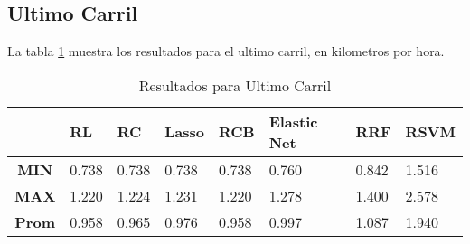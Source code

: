 \subsection{Ultimo Carril}

La tabla \ref{tab:resultadosScikitUltimoCarril} muestra los resultados para el ultimo carril, en kilometros por hora.


\begin{table}[H]
    \centering
    \caption{Resultados para Ultimo Carril}
    \label{tab:resultadosScikitUltimoCarril}
    \begin{tabular}{|c|l|l|l|l|l|l|l|} \hline
        & \textbf{RL} & \textbf{RC} & \textbf{Lasso} & \textbf{RCB} & \textbf{Elastic Net} & \textbf{RRF} & \textbf{RSVM} \\ \hline

        \textbf{MIN} & 0.738 & 0.738 & 0.738 & 0.738 & 0.760 & 0.842 & 1.516 \\ \hline
        \textbf{MAX} & 1.220 & 1.224 & 1.231 & 1.220 & 1.278 & 1.400 & 2.578 \\ \hline
        \textbf{Prom} & 0.958 & 0.965 & 0.976 & 0.958 & 0.997 & 1.087 & 1.940 \\ \hline
    \end{tabular}
\end{table}

